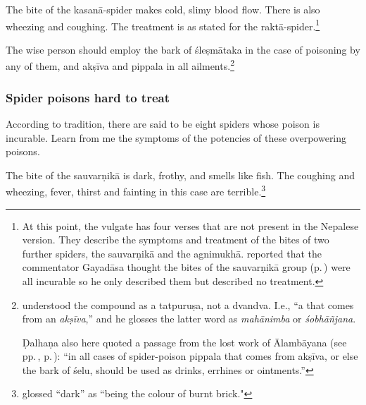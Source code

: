 \begin{translation}
\item[115]

The bite of the \Gls{kasanā-spider} makes cold, slimy blood flow.
There is also wheezing and coughing. The treatment is as stated for
the \Gls{raktā-spider}.\footnote{At this point, the vulgate has four
    verses that are not present in the Nepalese version.  They describe
    the symptoms and treatment of the bites of two further spiders, the
    \Gls{sauvarṇikā} and the \Gls{agnimukhā}.  
    reported that the commentator Gayadāsa thought the bites of the
    \Gls{sauvarṇikā} group (p.\,\pageref{sauvarnika-group}) were all incurable 
    so he only described them but described no treatment.}


 \item[120]
 
 The wise person should employ the bark of \gls{śleṣmātaka} in the case of 
 poisoning by any of them, and \gls{akṣīva} and \gls{pippala} in all 
 ailments.\footnote{ understood the compound  
  as a tatpuruṣa, not a dvandva. I.e., “a  
     that comes from an \emph{akṣīva},” and he glosses the latter word as 
     \emph{mahānimba} or \emph{śobhāñjana}.
     
     Ḍalhaṇa also here quoted a passage from the lost work of
Ālambāyana (see pp.\,\pageref{alambayana1},
p.\,\pageref{alambayana2}):  “in all cases of spider-poison \gls{pippala}
that comes from \gls{akṣīva}, or else the bark of \gls{śelu},
should be used as drinks, errhines or ointments.”}

\subsubsection{Spider poisons hard to treat}
  
\item[121]

According to tradition, there are said to be eight spiders whose poison
is incurable.  Learn from me the symptoms of the potencies of these 
overpowering poisons.

\item[122]

The bite of the \Gls{sauvarṇikā} is dark, frothy, and smells like fish.  The 
coughing and wheezing, fever, thirst and fainting in this case are 
terrible.\footnote{ glossed  “dark” as 
“being the colour of burnt brick."}


\end{translation}
